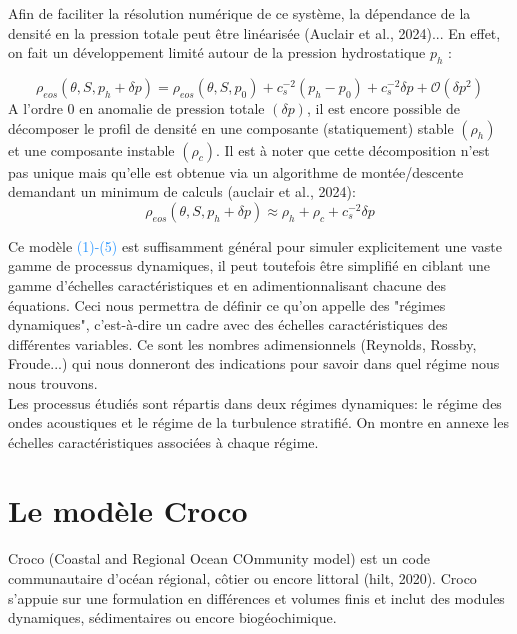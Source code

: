 \documentclass{rapportECC}
\newcommand{\FAadd}[1]{\textcolor{DodgerBlue}{{#1}}}                     %
\begin{document}
\vspace{0.5 cm}
Afin de faciliter la résolution numérique de ce système, la dépendance de la densité en la pression totale peut être linéarisée (Auclair et al., 2024)... En effet, on fait un développement limité autour de la pression hydrostatique $p_h$ :

\begin{equation}
    \rho_{eos}(\theta, S, p_h +\delta p) = \rho_{eos}(\theta, S, p_0) + c_s^{-2}(p_h - p_0) + c_s^{-2}\delta p+\mathcal{O}(\delta p^2)
\end{equation}
A l'ordre 0 en anomalie de pression totale $(\delta p)$, il est encore possible de décomposer le profil de densité en une composante (statiquement) stable $(\rho_h)$ et une composante instable $(\rho_c)$. Il est à noter que cette décomposition n'est pas unique mais qu'elle est obtenue via un algorithme de montée/descente demandant un minimum de calculs (auclair et al., 2024):
\begin{equation}
     \rho_{eos}(\theta, S, p_h +\delta p) \approx  \rho_h + \rho_c + c_s^{-2}\delta p
     \label{eq:decomp densite}
\end{equation}

\vspace{0.5 cm}

Ce modèle \FAadd{(1)-(5)} est suffisamment général pour simuler explicitement une vaste gamme de processus dynamiques, il peut toutefois être simplifié en ciblant une gamme d'échelles caractéristiques et en adimentionnalisant chacune des équations. Ceci nous permettra de définir ce qu'on appelle des "régimes dynamiques", c'est-à-dire un cadre avec des échelles caractéristiques des différentes variables. Ce sont les nombres adimensionnels (Reynolds, Rossby, Froude...) qui nous donneront des indications pour savoir dans quel régime nous nous trouvons.\\
Les processus étudiés sont répartis dans deux régimes dynamiques: le régime des ondes acoustiques et le régime de la turbulence stratifié. On montre en annexe les échelles caractéristiques associées à chaque régime.


\section{Le modèle Croco}
Croco (Coastal and Regional Ocean COmmunity model) est un code communautaire d'océan régional, côtier ou encore littoral (hilt, 2020). Croco s'appuie sur une formulation en différences et volumes finis et inclut des modules dynamiques, sédimentaires ou encore biogéochimique. \\
\end{document}
